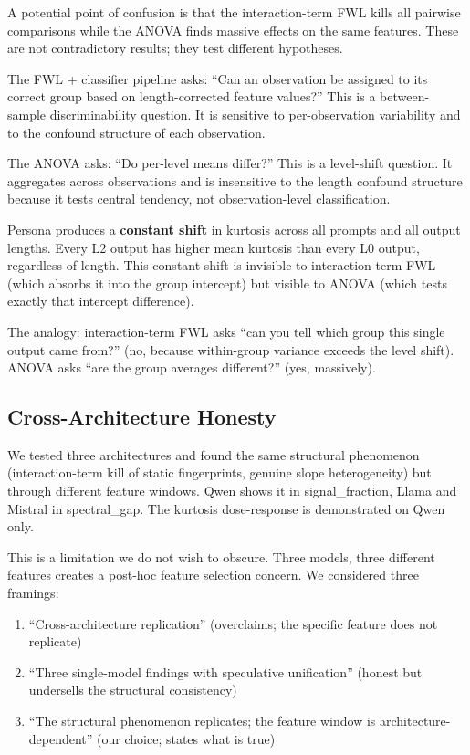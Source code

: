 \documentclass[11pt]{article}
\begin{document}
A potential point of confusion is that the interaction-term FWL kills all pairwise comparisons while the ANOVA finds massive effects on the same features. These are not contradictory results; they test different hypotheses.

The FWL + classifier pipeline asks: ``Can an observation be assigned to its correct group based on length-corrected feature values?'' This is a between-sample discriminability question. It is sensitive to per-observation variability and to the confound structure of each observation.

The ANOVA asks: ``Do per-level means differ?'' This is a level-shift question. It aggregates across observations and is insensitive to the length confound structure because it tests central tendency, not observation-level classification.

Persona produces a \textbf{constant shift} in kurtosis across all prompts and all output lengths. Every L2 output has higher mean kurtosis than every L0 output, regardless of length. This constant shift is invisible to interaction-term FWL (which absorbs it into the group intercept) but visible to ANOVA (which tests exactly that intercept difference).

The analogy: interaction-term FWL asks ``can you tell which group this single output came from?'' (no, because within-group variance exceeds the level shift). ANOVA asks ``are the group averages different?'' (yes, massively).

\subsection{Cross-Architecture Honesty}
\label{sec:cross-architecture}

We tested three architectures and found the same structural phenomenon (interaction-term kill of static fingerprints, genuine slope heterogeneity) but through different feature windows. Qwen shows it in signal\_fraction, Llama and Mistral in spectral\_gap. The kurtosis dose-response is demonstrated on Qwen only.

This is a limitation we do not wish to obscure. Three models, three different features creates a post-hoc feature selection concern. We considered three framings:

\begin{enumerate}
  \item ``Cross-architecture replication'' (overclaims; the specific feature does not replicate)
  \item ``Three single-model findings with speculative unification'' (honest but undersells the structural consistency)
  \item ``The structural phenomenon replicates; the feature window is architecture-dependent'' (our choice; states what is true)
\end{enumerate}
\end{document}
